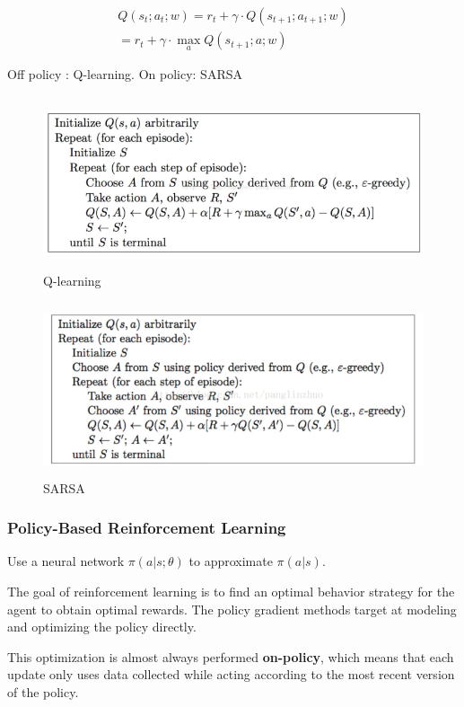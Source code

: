\documentclass{article}
\begin{document}
\begin{CJK*}{UTF8}{gbsn}
\begin{align*}
Q(s_{t};a_{t};w) = r_{t}+\gamma \cdot Q(s_{t+1};a_{t+1};w) \\
= r_{t}+\gamma \cdot \max \limits_{a} Q(s_{t+1};a;w)
\end{align*}

Off policy : Q-learning. On policy: SARSA

\begin{figure}[H]
\centering
\includegraphics[width=6in,height=2in]{ql}
\caption{Q-learning}
\end{figure}


\begin{figure}[H]
\centering
\includegraphics[width=6in,height=2in]{sarsa}
\caption{SARSA}
\end{figure}

\subsubsection{Policy-Based Reinforcement Learning}

Use a neural network $\pi(a|s;\theta)$ to approximate $\pi(a|s)$.

The goal of reinforcement learning is to find an optimal behavior strategy for the agent to obtain optimal rewards. The policy gradient methods target at modeling and optimizing the policy directly.

 This optimization is almost always performed \textbf{on-policy}, which means that each update only uses data collected while acting according to the most recent version of the policy.


\end{CJK*}
\end{document}
